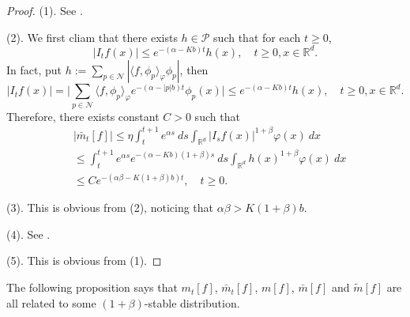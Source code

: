 \documentclass[12pt,a4paper]{amsart}
\theoremstyle{plain}
\newtheorem{lem}[thm]{Lemma}
\theoremstyle{definition}
\numberwithin{equation}{section}
\begin{document}
\begin{proof}
    (1). See \cite[Lemma 2.7]{MarksMilos2018CLT}. 
    
    (2). We first cliam that there exists $h\in \mathcal{P}$ such that for each $t\geq 0$,
\[
    |I_tf(x)|
    \leq e^{-(\alpha-Kb)t}h(x),
    \quad t\geq 0, x\in \mathbb{R}^d.
\]
    In fact, put $h:= \sum_{p\in \mathcal N} |\langle f,\phi_p\rangle_{\varphi}\phi_p|$, then
\[
    |I_tf(x)|
    =\Big|\sum_{p\in\mathcal{N}} \langle f,\phi_p\rangle_{\varphi} e^{-(\alpha-|p|b)t}\phi_p(x)\Big|
    \leq e^{-(\alpha-Kb)t}h(x),
    \quad t\geq 0,x\in \mathbb{R}^d.
\]
    Therefore, there exists constant $C>0$ such that
\begin{align}
    &|\bar{m}_t[f]|
    \leq \eta \int_{t}^{t+1} e^{\alpha s}~ds \int_{\mathbb R^d} | I_sf(x)|^{1+\beta}\varphi(x)~dx
    \\&\leq \int_{t}^{t+1} e^{\alpha s}e^{-(\alpha-Kb)(1+\beta)s}~ds\int_{\mathbb R^d} h(x)^{1+\beta}\varphi(x)~dx
    \\&\leq C e^{-(\alpha\beta-K(1+\beta)b)t},
    \quad t\geq 0.
\end{align}

    (3). This is obvious from (2), noticing that $\alpha\beta>K(1+\beta)b$.

    (4). See \cite[Lemma 4.2]{MarksMilos2018CLT}.

    (5). This is obvious from (1).
\end{proof}
    The following proposition says that $m_t[f]$, $\bar m_t[f]$, $m[f]$, $\bar m[f]$ and $\tilde m[f]$ are all related to some $(1+\beta)$-stable distribution. 
\end{document}
